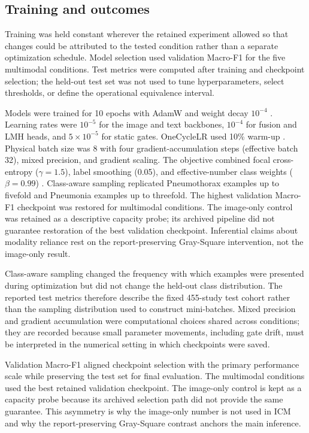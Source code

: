 \documentclass[10pt,a4paper,twocolumn]{article}
\begin{document}
\subsection{Training and outcomes}\label{sec:training}

Training was held constant wherever the retained experiment allowed so that
changes could be attributed to the tested condition rather than a separate
optimization schedule. Model selection used validation Macro-F1 for the five
multimodal conditions. Test metrics were computed after training and checkpoint
selection; the held-out test set was not used to tune hyperparameters, select
thresholds, or define the operational equivalence interval.

Models were trained for 10 epochs with AdamW and weight decay $10^{-4}$
\cite{loshchilov2019adamw}. Learning rates were $10^{-5}$ for the image and text
backbones, $10^{-4}$ for fusion and LMH heads, and $5\times10^{-5}$ for static
gates. OneCycleLR used 10\% warm-up \cite{smith2019superconvergence}. Physical
batch size was 8 with four gradient-accumulation steps (effective batch 32),
mixed precision, and gradient scaling. The objective combined focal
cross-entropy ($\gamma=1.5$), label smoothing (0.05), and effective-number class
weights ($\beta=0.99$) \cite{lin2017focalloss}. Class-aware sampling replicated
Pneumothorax examples up to fivefold and Pneumonia examples up to threefold.
The highest validation Macro-F1 checkpoint was restored for multimodal
conditions. The image-only control was retained as a descriptive capacity
probe; its archived pipeline did not guarantee restoration of the best
validation checkpoint. Inferential claims about modality reliance rest on the
report-preserving Gray-Square intervention, not the image-only result.

Class-aware sampling changed the frequency with which examples were presented
during optimization but did not change the held-out class distribution. The
reported test metrics therefore describe the fixed 455-study test cohort rather
than the sampling distribution used to construct mini-batches. Mixed precision
and gradient accumulation were computational choices shared across conditions;
they are recorded because small parameter movements, including gate drift, must
be interpreted in the numerical setting in which checkpoints were saved.

Validation Macro-F1 aligned checkpoint selection with the primary performance
scale while preserving the test set for final evaluation. The multimodal
conditions used the best retained validation checkpoint. The image-only control
is kept as a capacity probe because its archived selection path did not provide
the same guarantee. This asymmetry is why the image-only number is not used in
ICM and why the report-preserving Gray-Square contrast anchors the main
inference.
\end{document}
